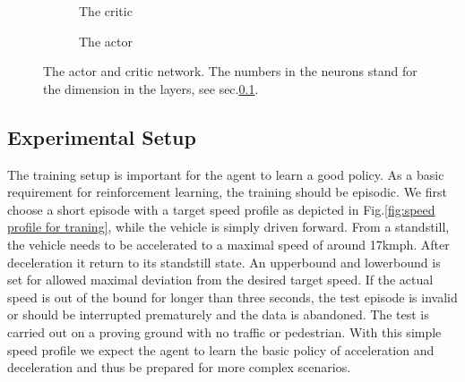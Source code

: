\documentclass[conference]{IEEEtran}
\begin{document}
\begin{figure}[ht]
	\centering
	\begin{subfigure}[b]{0.55\textwidth}
		\centering
		\def\svgwidth{\columnwidth}
		
		\caption{\label{fig:critic} The critic}
	\end{subfigure}
	\hfill
	\begin{subfigure}[b]{0.4\textwidth}
		\centering
		\def\svgwidth{\columnwidth}
		
		\caption{\label{fig:actor} The actor}
	\end{subfigure}
	\caption{The actor and critic network. The numbers in the neurons stand for the dimension in the layers, see sec.\@\ref{sec:setup}.}\label{fig:actorcritic}
\end{figure}


%	
%	


\subsection{Experimental Setup}\label{sec:setup}

The training setup is important for the agent to learn a good policy. As a basic requirement for reinforcement learning, the training should be episodic. We first choose a short episode with a target speed profile as depicted in Fig.\@\ref{fig:speed profile for traning}, while the vehicle is simply driven forward. From a standstill, the vehicle needs to be accelerated to a maximal speed of around 17kmph. After deceleration it return to its standstill state. An upperbound and lowerbound is set for allowed maximal deviation from the desired target speed. If the actual speed is out of the bound for longer than three seconds, the test episode is invalid or should be interrupted prematurely and the data is abandoned. The test is carried out on a proving ground with no traffic or pedestrian. With this simple speed profile we expect the agent to learn the basic policy of acceleration and deceleration and thus be prepared for more complex scenarios.
\end{document}
